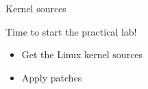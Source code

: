 \setuplabframe
{Kernel sources}
{
  Time to start the practical lab!
  \begin{itemize}
  \item Get the Linux kernel sources
  \item Apply patches
  \end{itemize}
}
